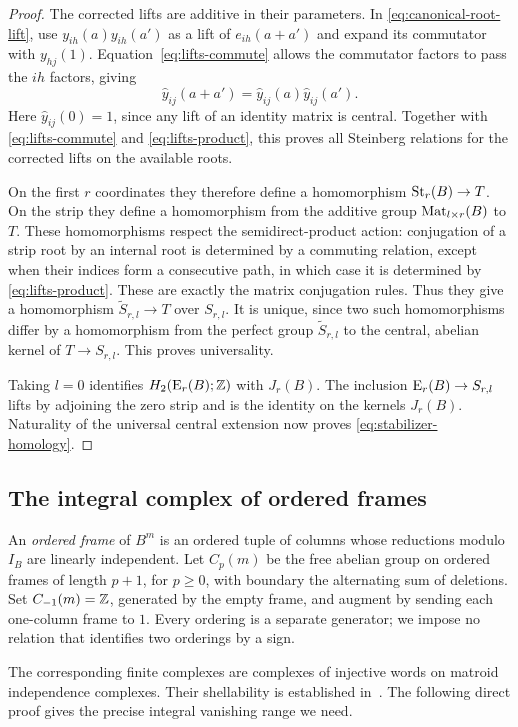 \begin{proof}
The corrected lifts are additive in their parameters. In
\eqref{eq:canonical-root-lift}, use
$y_{ih}(a)y_{ih}(a')$ as a lift of $e_{ih}(a+a')$ and expand its
commutator with $y_{hj}(1)$. Equation~\eqref{eq:lifts-commute}
allows the commutator factors to pass the $ih$ factors, giving
\[
 \widehat y_{ij}(a+a')=
 \widehat y_{ij}(a)\widehat y_{ij}(a').
\]
Here $\widehat y_{ij}(0)=1$, since any lift of an identity matrix
is central. Together with \eqref{eq:lifts-commute} and
\eqref{eq:lifts-product}, this proves all Steinberg relations for
the corrected lifts on the available roots.

On the first $r$ coordinates they therefore define a homomorphism
$\operatorname{St}_r(B)\to T$. On the strip they define a homomorphism from the
additive group $\operatorname{Mat}_{l\times r}(B)$ to $T$. These homomorphisms
respect the semidirect-product action: conjugation of a strip root
by an internal root is determined by a commuting relation, except
when their indices form a consecutive path, in which case it is
determined by \eqref{eq:lifts-product}. These are exactly the
matrix conjugation rules. Thus they give a homomorphism
$\widetilde S_{r,l}\to T$ over $S_{r,l}$. It is unique, since two
such homomorphisms differ by a homomorphism from the perfect group
$\widetilde S_{r,l}$ to the central, abelian kernel of $T\to S_{r,l}$.
This proves universality.

Taking $l=0$ identifies $H_2(\operatorname{E}_r(B);\mathbb Z)$ with $J_r(B)$.
The inclusion $\operatorname{E}_r(B)\to S_{r,l}$ lifts by adjoining the zero
strip and is the identity on the kernels $J_r(B)$. Naturality of
the universal central extension now proves
\eqref{eq:stabilizer-homology}.
\end{proof}

\subsection{The integral complex of ordered frames}

An \emph{ordered frame} of $B^m$ is an ordered tuple of columns
whose reductions modulo $I_B$ are linearly independent. Let $C_p(m)$
be the free abelian group on ordered frames of length $p+1$, for
$p\geq0$, with boundary the alternating sum of deletions. Set
$C_{-1}(m)=\mathbb Z$, generated by the empty frame, and augment by sending
each one-column frame to $1$. Every ordering is a separate generator;
we impose no relation that identifies two orderings by a sign.

The corresponding finite complexes are complexes of injective words
on matroid independence complexes. Their shellability is established
in~\cite[Theorem~1.2 and Example~3.3]{JonssonWelker2009}. The following
direct proof gives the precise integral vanishing range we need.

